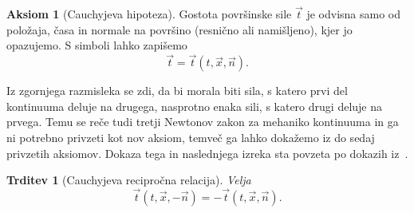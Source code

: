 \documentclass[12pt,a4paper,twoside]{article}
\theoremstyle{definition} %
\newtheorem{aksiom}{Aksiom}
\theoremstyle{plain} %
\newtheorem{trditev}[definicija]{Trditev}
\numberwithin{equation}{section}
\newcommand{\vt}{\vec{t}}
\newcommand{\vn}{\vec{n}}
\newcommand{\vx}{\vec{x}}
\begin{document}
\begin{aksiom}[Cauchyjeva hipoteza]
  Gostota površinske sile $\vt$ je odvisna samo od položaja, časa in normale
  na površino (resnično ali namišljeno), kjer jo opazujemo. S simboli lahko zapišemo
  \begin{equation}
    \vt = \vt(t, \vx, \vn).
  \end{equation}
\end{aksiom}

Iz zgornjega razmisleka se zdi, da bi morala biti sila, s katero prvi del
kontinuuma deluje na drugega, nasprotno enaka sili, s katero drugi deluje na
prvega. Temu se reče tudi tretji Newtonov zakon za mehaniko kontinuuma in
ga ni potrebno privzeti kot nov aksiom, temveč ga lahko dokažemo iz do sedaj
privzetih aksiomov. Dokaza tega in naslednjega izreka sta povzeta po dokazih
iz~\cite[str.\ 104--107]{hjelmstad2007fundamentals}.
\begin{trditev}[Cauchyjeva recipročna relacija]
  \label{trd:cauchy-reciprocal}
  Velja
  \begin{equation}
    \vt(t, \vx, -\vn) = -\vt(t, \vx, \vn).
    \label{eq:cauchy-reciprocal}
  \end{equation}
\end{trditev}
\end{document}
